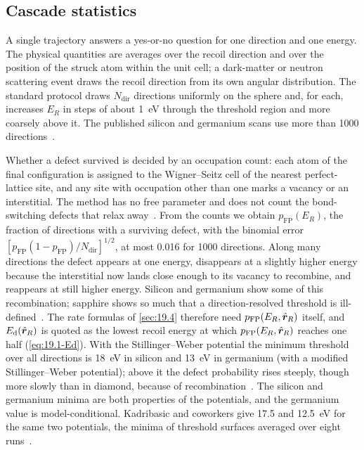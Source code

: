 \subsection{Cascade statistics}

A single trajectory answers a yes-or-no question for one direction and one energy. The physical quantities are averages over the recoil direction and over the position of the struck atom within the unit cell; a dark-matter or neutron scattering event draws the recoil direction from its own angular distribution. The standard protocol draws $N_{\mathrm{dir}}$ directions uniformly on the sphere and, for each, increases $E_R$ in steps of about \SI{1}{eV} through the threshold region and more coarsely above it. The published silicon and germanium scans use more than 1000 directions~\cite[Sect.~II\,A]{sassi2022energy}.

Whether a defect survived is decided by an occupation count: each atom of the final configuration is assigned to the Wigner--Seitz cell of the nearest perfect-lattice site, and any site with occupation other than one marks a vacancy or an interstitial. The method has no free parameter and does not count the bond-switching defects that relax away~\cite[Sect.~II\,A]{sassi2022energy}. From the counts we obtain $p_{\mathrm{FP}}(E_R)$, the fraction of directions with a surviving defect, with the binomial error $[p_{\mathrm{FP}}(1 - p_{\mathrm{FP}})/N_{\mathrm{dir}}]^{1/2}$, at most \num{0.016} for 1000 directions. Along many directions the defect appears at one energy, disappears at a slightly higher energy because the interstitial now lands close enough to its vacancy to recombine, and reappears at still higher energy. Silicon and germanium show some of this recombination; sapphire shows so much that a direction-resolved threshold is ill-defined~\cite[Sect.~II\,B]{sassi2022energy}. The rate formulas of \cref{sec:19.4} therefore need $p_{\mathrm{FP}}(E_R, \hat{\bm{r}}_R)$ itself, and $E_{\mathrm{d}}(\hat{\bm{r}}_R)$ is quoted as the lowest recoil energy at which $p_{\mathrm{FP}}(E_R, \hat{\bm{r}}_R)$ reaches one half (\cref{eq:19.1-Ed}). With the Stillinger--Weber potential the minimum threshold over all directions is \SI{18}{eV} in silicon and \SI{13}{eV} in germanium (with a modified Stillinger--Weber potential); above it the defect probability rises steeply, though more slowly than in diamond, because of recombination~\cite[Table~II, Fig.~1 and Sect.~II\,B]{sassi2022energy}. The silicon and germanium minima are both properties of the potentials, and the germanium value is model-conditional. Kadribasic and coworkers give 17.5 and \SI{12.5}{eV} for the same two potentials, the minima of threshold surfaces averaged over eight runs~\cite{kadribasic2018directional}.

